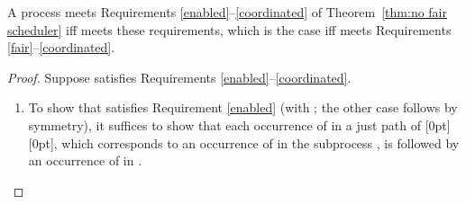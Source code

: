 \documentclass[smallcondensed]{svjour3}
\newcommand{\plat}[1]{\raisebox{0pt}[0pt][0pt]{#1}}  \def\precond#1{{\vphantom{#1}}^\bullet #1}
\newcommand{\Thm}[1]{Theorem~\ref{thm:#1}}
\begin{document}
\begin{theorem}\rm\label{thm:no fair scheduler2}
A process  meets Requirements \ref{enabled}--\ref{coordinated} of \Thm{no fair scheduler} iff
 meets these requirements, which is the case iff
 meets Requirements \ref{fair}--\ref{coordinated}.
\end{theorem}
\begin{proof}
Suppose  satisfies Requirements \ref{enabled}--\ref{coordinated}.
\begin{enumerate}
\item To show that  satisfies Requirement \ref{enabled} (with ; the other case
  follows by symmetry), it suffices to show that each occurrence of  in a just path of
  \plat{}, which corresponds to an occurrence of  in the subprocess , is followed by
  an occurrence of  in .


\end{enumerate}
\end{proof}
\end{document}
